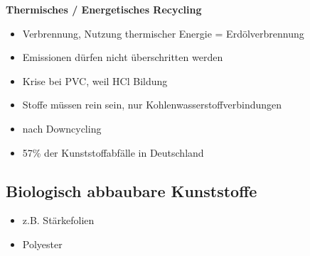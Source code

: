\vspace{0.3cm}

\textbf{Thermisches / Energetisches Recycling}
\begin{itemize}
    \item Verbrennung, Nutzung thermischer Energie = Erdölverbrennung
    \item Emissionen dürfen nicht überschritten werden
    \item Krise bei PVC, weil HCl Bildung
    \item Stoffe müssen rein sein, nur Kohlenwasserstoffverbindungen
    \item nach Downcycling
    \item 57\% der Kunststoffabfälle in Deutschland
\end{itemize}


\subsection{Biologisch abbaubare Kunststoffe}
\begin{itemize}
    \item z.B. Stärkefolien
    \item Polyester
\end{itemize}

